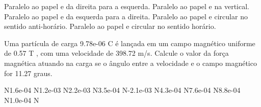 \documentclass[12pt, addpoints]{exam}
\begin{document}
\begin{questions}
\begin{multicols*}{2}
\begin{choices}
\choice Paralelo ao papel e da direita para a esquerda. 
\choice Paralelo ao papel e na vertical. 
\choice Paralelo ao papel e da esquerda para a direita. 
\choice Paralelo ao papel e circular no sentido anti-horário. 
\choice Paralelo ao papel e circular no sentido horário. 
\end{choices}
\question Uma partícula de carga 9.78e-06 C é lançada em um campo magnético uniforme de    0.57 T , com uma velocidade de 398.72 m/s. Calcule o valor da força magnética atuando na carga se o ângulo entre a velocidade e o campo magnético for   11.27 graus.

\begin{oneparchoices}
 N\choice 1.6e-04 N\choice 1.2e-03 N\choice 2.2e-03 N\choice 3.5e-04 N\choice -2.1e-03 N\choice 4.3e-04 N\choice 7.6e-04 N\choice 8.8e-04 N\choice 1.0e-04 N
\end{oneparchoices}\end{multicols*}
\end{questions}
\newpage
\end{document}

